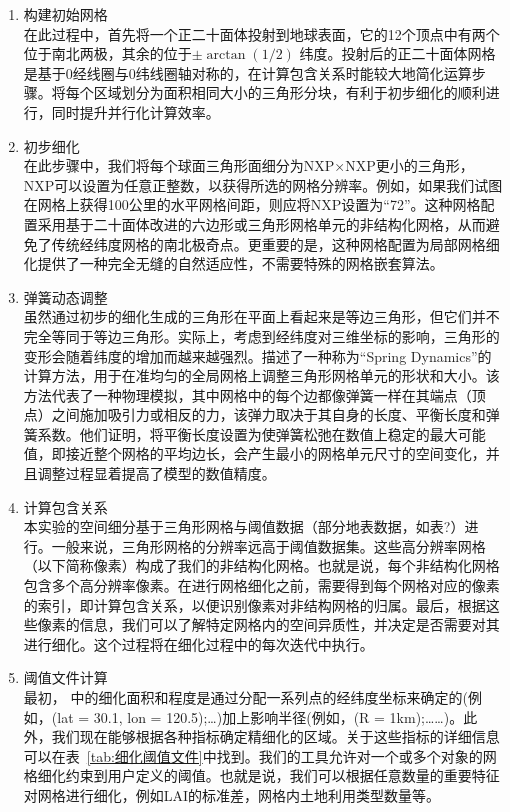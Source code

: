 \begin{enumerate}
\item 构建初始网格\\
在此过程中，首先将一个正二十面体投射到地球表面，它的12个顶点中有两个位于南北两极，其余的位于$\pm\arctan(1/2)$ 纬度。投射后的正二十面体网格是基于0\textdegree 经线圈与0\textdegree 纬线圈轴对称的，在计算包含关系时能较大地简化运算步骤。将每个区域划分为面积相同大小的三角形分块，有利于初步细化的顺利进行，同时提升并行化计算效率。
\item 初步细化\\
在此步骤中，我们将每个球面三角形面细分为NXP×NXP更小的三角形，NXP可以设置为任意正整数，以获得所选的网格分辨率。例如，如果我们试图在网格上获得100公里的水平网格间距，则应将NXP设置为“72”。这种网格配置采用基于二十面体改进的六边形或三角形网格单元的非结构化网格，从而避免了传统经纬度网格的南北极奇点。更重要的是，这种网格配置为局部网格细化提供了一种完全无缝的自然适应性，不需要特殊的网格嵌套算法。
\item 弹簧动态调整\\
虽然通过初步的细化生成的三角形在平面上看起来是等边三角形，但它们并不完全等同于等边三角形。实际上，考虑到经纬度对三维坐标的影响，三角形的变形会随着纬度的增加而越来越强烈。\citet{tomita2002optimization}描述了一种称为“Spring Dynamics”的计算方法，用于在准均匀的全局网格上调整三角形网格单元的形状和大小。该方法代表了一种物理模拟，其中网格中的每个边都像弹簧一样在其端点（顶点）之间施加吸引力或相反的力，该弹力取决于其自身的长度、平衡长度和弹簧系数。他们证明，将平衡长度设置为使弹簧松弛在数值上稳定的最大可能值，即接近整个网格的平均边长，会产生最小的网格单元尺寸的空间变化，并且调整过程显着提高了模型的数值精度。
\item 计算包含关系 \\
本实验的空间细分基于三角形网格与阈值数据（部分地表数据，如表?）进行。一般来说，三角形网格的分辨率远高于阈值数据集。这些高分辨率网格（以下简称像素）构成了我们的非结构化网格。也就是说，每个非结构化网格包含多个高分辨率像素。在进行网格细化之前，需要得到每个网格对应的像素的索引，即计算包含关系，以便识别像素对非结构网格的归属。最后，根据这些像素的信息，我们可以了解特定网格内的空间异质性，并决定是否需要对其进行细化。这个过程将在细化过程中的每次迭代中执行。
\item 阈值文件计算\\
最初，\citet{walko_direct_2011} 中的细化面积和程度是通过分配一系列点的经纬度坐标来确定的(例如，(lat = 30.1, lon = 120.5);…)加上影响半径(例如，(R = 1km);……)。此外，我们现在能够根据各种指标确定精细化的区域。关于这些指标的详细信息可以在表~\ref{tab:细化阈值文件}中找到。我们的工具允许对一个或多个对象的网格细化约束到用户定义的阈值。也就是说，我们可以根据任意数量的重要特征对网格进行细化，例如LAI的标准差，网格内土地利用类型数量等。

\end{enumerate}
